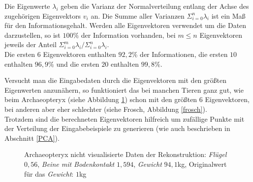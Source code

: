  Die Eigenwerte $\lambda_i$ geben die Varianz der Normalverteilung entlang der Achse des zugehörigen Eigenvektors $v_i$ an. Die Summe aller Varianzen $\Sigma_{i=0}^n \lambda_i$ ist ein Maß für den Informationsgehalt. Werden alle Eigenvektoren verwendet um die Daten darzustellen, so ist $100\%$ der Information vorhanden, bei $m \le n$ Eigenvektoren jeweils der Anteil $\Sigma_{i=0}^m \lambda_i / \Sigma_{i=0}^n \lambda_i$.\\
 Die ersten $6$ Eigenvektoren enthalten $92{,}2\%$ der Informationen, die ersten $10$ enthalten $96{,}9\%$ und die ersten $20$ enthalten $99{,}8\%$.
 
 Versucht man die Eingabedaten durch die Eigenvektoren mit den größten Eigenwerten anzunähern, so funktioniert das bei manchen Tieren ganz gut, wie \zb beim Archaeopteryx (siehe Abbildung \ref{archaeopteryx}) schon mit den größten $6$ Eigenvektoren, bei anderen aber eher schlechter (siehe Frosch, Abbildung \ref{frosch}).\\
 Trotzdem sind die berechneten Eigenvektoren hilfreich um zufällige Punkte mit der Verteilung der Eingabebeispiele zu generieren (wie auch beschrieben in Abschnitt \ref{PCA}).
 
 \begin{figure}
  \centering
  \qquad
  
  \caption{Archaeopteryx nicht visualisierte Daten der Rekonstruktion: \emph{Flügel} $0{,}56$, \emph{Beine mit Bodenkontakt} $1{,}594$, \emph{Gewicht} $94{,}1$kg, Originalwert für das \emph{Gewicht}: $1$kg}
  \label{archaeopteryx}
 \end{figure}
 
